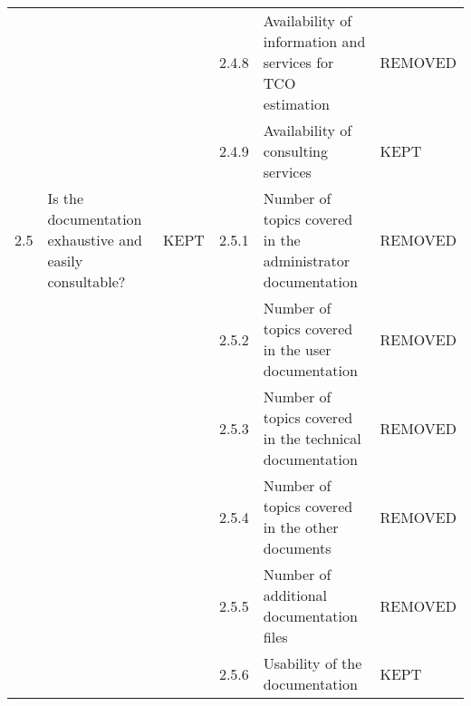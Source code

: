\begin{longtable}[]{@{}llllll@{}}
& & & 2.4.8 & Availability of information and services for TCO
estimation & REMOVED \\
& & & 2.4.9 & Availability of consulting services & KEPT \\
2.5 & Is the documentation exhaustive and easily consultable? & KEPT &
2.5.1 & Number of topics covered in the administrator documentation &
REMOVED \\
& & & 2.5.2 & Number of topics covered in the user documentation &
REMOVED \\
& & & 2.5.3 & Number of topics covered in the technical documentation &
REMOVED \\
& & & 2.5.4 & Number of topics covered in the other documents &
REMOVED \\
& & & 2.5.5 & Number of additional documentation files & REMOVED \\
& & & 2.5.6 & Usability of the documentation & KEPT \\
\bottomrule
\end{longtable}
